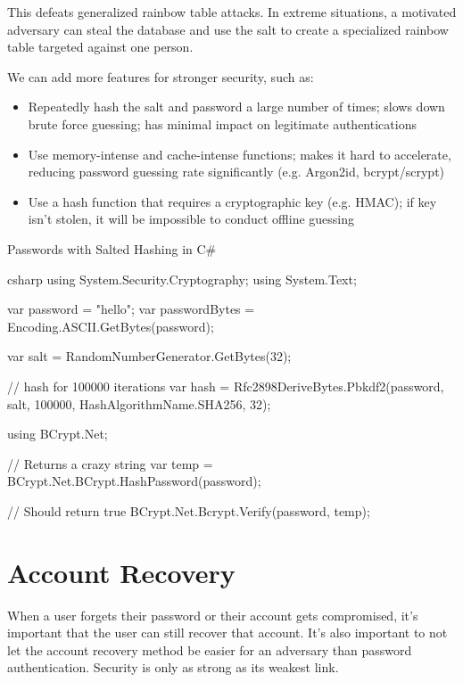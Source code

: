 \documentclass[code]{amznotes}
\begin{document}
This defeats generalized rainbow table attacks. In extreme situations, a motivated adversary can steal the database and use the salt to create a specialized rainbow table targeted against one person.

We can add more features for stronger security, such as:
\begin{itemize}[noitemsep]
    \item {} Repeatedly hash the salt and password a large number of times; slows down brute force guessing; has minimal impact on legitimate authentications
    \item {} Use memory-intense and cache-intense functions; makes it hard to accelerate, reducing password guessing rate significantly (e.g. Argon2id, bcrypt/scrypt)
    \item {} Use a hash function that requires a cryptographic key (e.g. HMAC); if key isn't stolen, it will be impossible to conduct offline guessing
\end{itemize}

\begin{codebox}{Passwords with Salted Hashing in C\#}{}{}
    \begin{amzcode}{csharp}
using System.Security.Cryptography;
using System.Text;

var password = "hello";
var passwordBytes = Encoding.ASCII.GetBytes(password);

var salt = RandomNumberGenerator.GetBytes(32);

// hash for 100000 iterations
var hash = Rfc2898DeriveBytes.Pbkdf2(password, salt, 100000, HashAlgorithmName.SHA256, 32);

using BCrypt.Net;

// Returns a crazy string
var temp = BCrypt.Net.BCrypt.HashPassword(password);

// Should return true
BCrypt.Net.Bcrypt.Verify(password, temp);
    \end{amzcode}
\end{codebox}

\section{Account Recovery}

When a user forgets their password or their account gets compromised, it's important that the user can still recover that account. It's also important to not let the account recovery method be easier for an adversary than password authentication. Security is only as strong as its weakest link.
\end{document}
